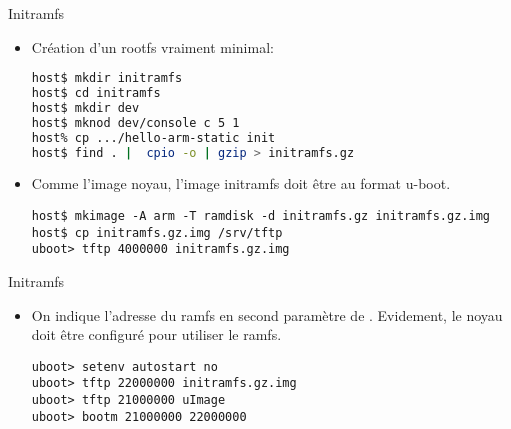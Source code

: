 \begin{frame}[fragile=singleslide]{Initramfs}
  \begin{itemize} 
  \item Création d'un rootfs vraiment minimal:
    \begin{lstlisting}[language=sh]
host$ mkdir initramfs
host$ cd initramfs
host$ mkdir dev
host$ mknod dev/console c 5 1
host% cp .../hello-arm-static init
host$ find . |  cpio -o | gzip > initramfs.gz
    \end{lstlisting} %
  \item Comme l'image noyau, l'image initramfs doit être au format u-boot.
    \begin{lstlisting} 
host$ mkimage -A arm -T ramdisk -d initramfs.gz initramfs.gz.img
host$ cp initramfs.gz.img /srv/tftp
uboot> tftp 4000000 initramfs.gz.img
    \end{lstlisting}
  \end{itemize}
\end{frame}

\begin{frame}[fragile=singleslide]{Initramfs}
  \begin{itemize} 
  \item  On  indique  l'adresse   du  ramfs  en  second  paramètre  de
    . Evidement, le noyau doit être configuré pour utiliser
    le ramfs.
    \begin{lstlisting} 
uboot> setenv autostart no
uboot> tftp 22000000 initramfs.gz.img 
uboot> tftp 21000000 uImage 
uboot> bootm 21000000 22000000 
    \end{lstlisting}
  \end{itemize}
\end{frame}


